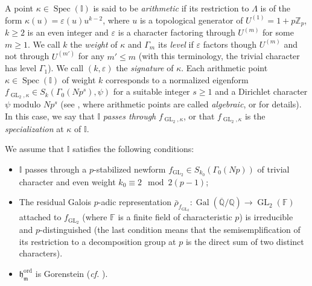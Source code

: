 \documentclass[a4paper,11pt]{amsart}
\numberwithin{equation}{section}
\theoremstyle{plain}
\theoremstyle{definition}
\theoremstyle{remark}
\newcommand{\Q}{\mathbb{Q}}
\newcommand{\Z}{\mathbb{Z}}
\newcommand{\I}{\mathbb{I}}
\DeclareMathOperator{\Spec}{Spec}
\DeclareMathOperator{\Gal}{Gal}
\DeclareMathOperator{\GL}{GL}
\newcommand{\ord}{\mathrm{ord}}
\begin{document}
A point $\kappa\in\Spec(\I)$ is said to be \emph{arithmetic} if its restriction 
to $\Lambda$ is of the form $\kappa(u)=\varepsilon(u)u^{k-2}$, where $u$ is a topological generator of $U^{(1)}=1+p\Z_p$, 
$k\geq 2$ is an even integer and $\varepsilon$ is a character factoring through $U^{(m)}$ for some $m\geq 1$.  
We call $k$ the \emph{weight} of $\kappa$ and $\Gamma_m$ its \emph{level}
if $\varepsilon$ factors though $U^{(m)}$ and not through $U^{(m')}$ for any $m'\leq m$ (with this terminology, the trivial character has level $\Gamma_1$). We call $(k,\varepsilon)$ the \emph{signature} of $\kappa$.
Each arithmetic point $\kappa\in\Spec(\I)$ of weight $k$ corresponds to a normalized eigenform $f_{\GL_2,\kappa}\in S_k(\Gamma_0(Np^s),\psi)$ for a suitable integer $s\geq 1$ and a Dirichlet character $\psi$ modulo $Np^s$ 
(see \cite[Theorem III]{Hida-Annals}, where arithmetic points are called \emph{algebraic}, or \cite[Definition 2.1.1]{Howard-Inv} for details). In this case, we say that $\I$ \emph{passes through} $f_{\GL_2,\kappa}$, or that $f_{\GL_2,\kappa}$ is the \emph{specialization} at $\kappa$ of $\I$. 

We assume that $\mathbb{I}$ satisfies the following conditions: 
\begin{itemize}
    \item $\I$ passes through a $p$-stabilized newform $f_{\GL_2}\in S_{k_0}(\Gamma_0(Np))$ of trivial character and even weight $k_0\equiv 2\mod{2(p-1)}$;
    \item The residual Galois $p$-adic representation $\bar{\rho}_{f_{\GL_2}}\colon\Gal(\overline{\Q}/\Q)\rightarrow\GL_2(\mathbb{F})$ attached to $f_{\GL_2}$ (where $\mathbb{F}$ is a finite field of characteristic $p$) is irreducible and $p$-distinguished (the last condition means that the semisemplification of its restriction to a decomposition group at $p$ is the direct sum of two distinct characters).
    \item $\mathfrak{h}_\mathfrak{m}^\ord$ is Gorenstein (\emph{cf.} \cite[Assumption 6.2]{LV-MM}).
\end{itemize}
\end{document}
